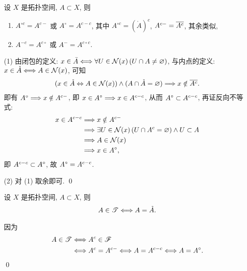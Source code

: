     \begin{Theorem}[内部与闭包的对偶]
        设 $ X $ 是拓扑空间, $ A\subset X $, 则
        \begin{enumerate}
            \item $ A^{\circ c}=A^{c-} $ 或 $ A^{\circ}=A^{c-c} $, 其中 $ A^{\circ c}=(\mathring{A})^{c} $, $ A^{c-}=\baro{A^{c}} $, 其余类似,
            \item $ A^{-c}=A^{c\circ} $ 或 $ A^{-}=A^{c\circ c} $.
        \end{enumerate}
    \end{Theorem}
    \begin{Proof}
        (1)  由闭包的定义: $ x\in\bar{A}\Longleftrightarrow \forall U\in\CN(x)\,(U\cap A\neq \varnothing) $, 与内点的定义: $ x\in\mathring{A}\Longleftrightarrow A\in\CN(x) $, 可知
        \begin{align*}
            (x\in\mathring{A}\Leftrightarrow A\in\CN(x))\land (A\cap \mathring{A}=\varnothing)\Longrightarrow x\notin \baro{A^{c}}.
        \end{align*}
        即有 $ A\degree\Longrightarrow x\notin A^{c-} $, 即 $ x\in A\degree\Longrightarrow x\in A^{c-c} $, 从而 $ A\degree\subset A^{c-c} $, 再证反向不等式:
        \begin{align*}
            x\in A^{c-c} & \Longrightarrow x\notin A^{c-}\\
            & \Longrightarrow \exists U\in\CN(x)\,(U\cap A^{c}=\varnothing)\land U\subset A\\
            & \Longrightarrow A\in \CN(x)\\
            & \Longrightarrow x\in A\degree,
        \end{align*}
        即 $ A^{c-c}\subset A\degree $, 故 $ A\degree=A^{c-c} $.

        (2) 对 (1) 取余即可. \qed
    \end{Proof}

    \begin{Theorem}[用内部刻画开集]
        设 $ X $ 是拓扑空间, $ A\subset X $, 则
        \begin{align*}
            A\in\ST\Longleftrightarrow A=\mathring{A}.
        \end{align*}
    \end{Theorem}
    \begin{Proof}
        因为
        \begin{align*}
            A\in\ST & \Longleftrightarrow A^{c}\in \SF\\
            & \Longleftrightarrow A^{c}=A^{c-}\Longleftrightarrow A=A^{c-c}\Longleftrightarrow A=A^{\circ}.
        \end{align*}
        \qed 
    \end{Proof}

